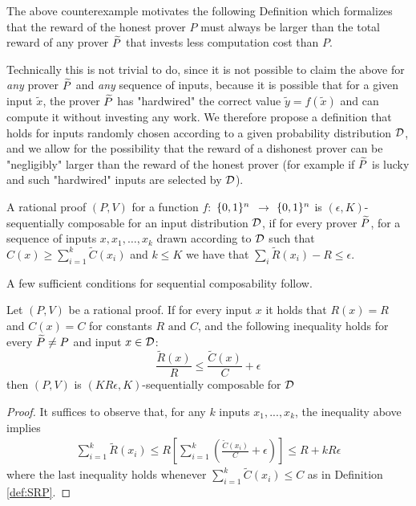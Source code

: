 
The above counterexample motivates the following Definition which formalizes 
that the reward of the honest prover $P$ must always be larger than the total 
reward of any prover $\widetilde{P}$ that invests less computation cost than $P$. 

Technically this is not trivial to do, since it is not possible to claim the above for {\em any} prover $\widetilde{P}$ and {\em any} sequence of inputs, because it
is possible that for a given input $\tilde{x}$, the prover $\widetilde{P}$ has "hardwired" the correct value $\tilde{y}=f(\tilde{x})$ and can compute it without investing 
any work. We therefore propose a definition that holds for inputs randomly chosen according to a given probability distribution $\cal D$, and we allow for
the possibility that the reward of a dishonest prover can be "negligibly" larger than the reward of the honest prover (for example if $\widetilde{P}$ is lucky and such 
"hardwired" inputs are selected by $\cal D$).

\noindent
\begin{definition}
	\label{def:SRP}
	A rational proof $(P,V)$ for a function $f:$ $\{0, 1\}^n$ $\to$ 
	$\{0, 1\}^n$ is $(\epsilon, K)$-{\sf sequentially composable} for an input distribution $\cal D$, if for every prover $\widetilde{P}$, 
	for a sequence of inputs 
	$x,x_1,\ldots,x_k$ drawn according to ${\cal D}$ such that $C(x) \geq \sum_{i=1}^k 
	\tilde{C}(x_i)$ and $k \leq K$ we have that $\sum_{i}\tilde{R}(x_i) - R \leq \epsilon$.
\end{definition}

\noindent
A few sufficient conditions for sequential composability follow.

\begin{lemma}
\label{lemma:cost-rew-ratios}
Let $(P,V)$ be a rational proof.
If for every input $x$  it holds that $R(x)=R$ and  $C(x)=C$ for constants 
$R \mbox{ and } C$, and the 
following inequality holds for every 
$\widetilde{P}\neq 
P$ and input $x\in {\cal D}$:
\[ \frac{\tilde{R}(x)}{R} \leq \frac{\tilde{C}(x)}{C} + \epsilon\]
then $(P,V)$ is $(KR\epsilon, K)$-sequentially composable for $\cal D$
\end{lemma}
\begin{proof}
It suffices to observe that, for any $k$ inputs $x_1,...,x_k$, the inequality 
above 
implies
\begin{align*}
\sum_{i=1}^{k}\tilde{R}(x_i)  \leq R [\sum_{i=1}^{k} (\frac{\tilde{C}(x_i)}{C}  + \epsilon) ] 
\leq R +kR\epsilon
\end{align*}
where the last inequality holds whenever $\sum_{i=1}^{k} \tilde{C}(x_i) \leq C$ 
as 
in Definition \ref{def:SRP}.
\end{proof}


